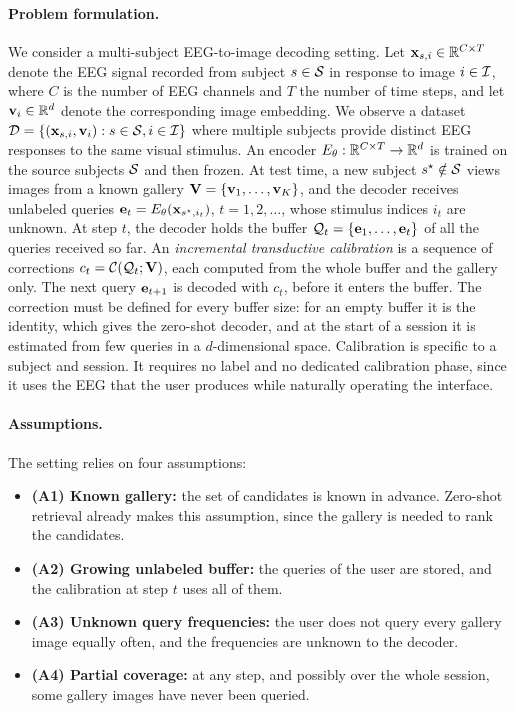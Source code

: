 \documentclass[10pt,twocolumn,letterpaper]{article}
\begin{document}
\paragraph{Problem formulation.}
We consider a multi-subject EEG-to-image decoding setting. Let ${\bf x}_{s,i} \in {\mathbb R}^{C\times T}$ denote the EEG signal recorded from subject $s \in {\cal S}$ in response to image $i \in {\cal I}$, where $C$ is the number of EEG channels and $T$ the number of time steps, and let ${\bf v}_i \in {\mathbb R}^{d}$ denote the corresponding image embedding. We observe a dataset ${\cal D} = \{({\bf x}_{s,i}, {\bf v}_i): s\in {\cal S}, i \in {\cal I}\}$ where multiple subjects provide distinct EEG responses to the same visual stimulus. An encoder $E_\theta : {\mathbb R}^{C \times T} \to {\mathbb R}^d$ is trained on the source subjects ${\cal S}$ and then frozen. At test time, a new subject $s^\star \notin {\cal S}$ views images from a known gallery ${\bf V} = \{{\bf v}_1,\ldots,{\bf v}_K\}$, and the decoder receives unlabeled queries ${\bf e}_t = E_\theta({\bf x}_{s^\star,i_t})$, $t=1,2,\ldots$, whose stimulus indices $i_t$ are unknown. At step $t$, the decoder holds the buffer ${\cal Q}_t = \{{\bf e}_1,\ldots,{\bf e}_t\}$ of all the queries received so far. An \emph{incremental transductive calibration} is a sequence of corrections $c_t = {\cal C}({\cal Q}_t;{\bf V})$, each computed from the whole buffer and the gallery only. The next query ${\bf e}_{t+1}$ is decoded with $c_t$, before it enters the buffer. The correction must be defined for every buffer size: for an empty buffer it is the identity, which gives the zero-shot decoder, and at the start of a session it is estimated from few queries in a $d$-dimensional space. Calibration is specific to a subject and session. It requires no label and no dedicated calibration phase, since it uses the EEG that the user produces while naturally operating the interface.

\paragraph{Assumptions.}
The setting relies on four assumptions:
\begin{itemize}
    \item \textbf{(A1) Known gallery:} the set of candidates is known in advance. Zero-shot retrieval already makes this assumption, since the gallery is needed to rank the candidates.
    \item \textbf{(A2) Growing unlabeled buffer:} the queries of the user are stored, and the calibration at step $t$ uses all of them.
    \item \textbf{(A3) Unknown query frequencies:} the user does not query every gallery image equally often, and the frequencies are unknown to the decoder.
    \item \textbf{(A4) Partial coverage:} at any step, and possibly over the whole session, some gallery images have never been queried.
\end{itemize}
\end{document}
